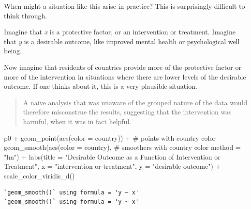 \documentclass[
  letterpaper,
  DIV=11,
  numbers=noendperiod]{scrreprt}
\newenvironment{Shaded}{\begin{snugshade}}{\end{snugshade}}
\newcommand{\AttributeTok}[1]{\textcolor[rgb]{0.40,0.45,0.13}{#1}}
\newcommand{\CommentTok}[1]{\textcolor[rgb]{0.37,0.37,0.37}{#1}}
\newcommand{\FunctionTok}[1]{\textcolor[rgb]{0.28,0.35,0.67}{#1}}
\newcommand{\NormalTok}[1]{\textcolor[rgb]{0.00,0.23,0.31}{#1}}
\newcommand{\SpecialCharTok}[1]{\textcolor[rgb]{0.37,0.37,0.37}{#1}}
\newcommand{\StringTok}[1]{\textcolor[rgb]{0.13,0.47,0.30}{#1}}
\begin{document}
When might a situation like this arise in practice? This is surprisingly
difficult to think through.

Imagine that \emph{x} is a protective factor, or an intervention or
treatment. Imagine that \emph{y} is a desirable outcome, like improved
mental health or psychological well being.

Now imagine that residents of countries provide more of the protective
factor or more of the intervention in situations where there are lower
levels of the desirable outcome. If one thinks about it, this is a very
plausible situation.

\begin{quote}
A naive analysis that was unaware of the grouped nature of the data
would therefore misconstrue the results, suggesting that the
intervention was harmful, when it was in fact helpful.
\end{quote}

\begin{Shaded}
\begin{Highlighting}[]
\NormalTok{p0 }\SpecialCharTok{+} 
  \FunctionTok{geom\_point}\NormalTok{(}\FunctionTok{aes}\NormalTok{(}\AttributeTok{color =}\NormalTok{ country)) }\SpecialCharTok{+} \CommentTok{\# points with country color}
  \FunctionTok{geom\_smooth}\NormalTok{(}\FunctionTok{aes}\NormalTok{(}\AttributeTok{color =}\NormalTok{ country), }\CommentTok{\# smoothers with country color}
              \AttributeTok{method =} \StringTok{"lm"}\NormalTok{) }\SpecialCharTok{+} 
  \FunctionTok{labs}\NormalTok{(}\AttributeTok{title =} \StringTok{"Desirable Outcome as a Function of Intervention or Treatment"}\NormalTok{,}
       \AttributeTok{x =} \StringTok{"intervention or treatment"}\NormalTok{,}
       \AttributeTok{y =} \StringTok{"desirable outcome"}\NormalTok{) }\SpecialCharTok{+}
  \FunctionTok{scale\_color\_viridis\_d}\NormalTok{()}
\end{Highlighting}
\end{Shaded}

\begin{verbatim}
`geom_smooth()` using formula = 'y ~ x'
`geom_smooth()` using formula = 'y ~ x'
\end{verbatim}
\end{document}
